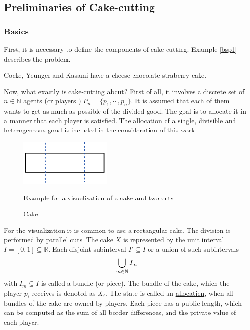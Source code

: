 \subsection{Preliminaries of Cake-cutting}
\subsubsection{Basics}
First, it is necessary to define the components of cake-cutting. Example \ref{bsp1} describes the problem.
%
\begin{bsp}
\label{bsp1}
Cocke, Younger and Kasami have a cheese-chocolate-straberry-cake. 
\end{bsp}
Now, what exactly is cake-cutting about? First of all, it involves a discrete set of $n \in \mathbb{N}$ agents (or players ) $P_n=\{p_1,\cdots,p_n\}$. It is assumed that each of them wants to get as much as possible of the divided good. The goal is to allocate it in a manner that each player is satisfied. The allocation of a single, divisible and heterogeneous good is included in the consideration of this work.\\ 
	\begin{figure}[h]
		\centering
 		 \includegraphics[width=130pt]{kek.pdf}
   \caption{Cake}Example for a visualisation of a cake and two cuts
  	 \end{figure}
For the visualization it is common to use a rectangular cake. The division is performed by parallel cuts. The cake $X$ is represented by the unit interval $I=[0,1] \subseteq \mathbb{R}$. Each disjoint subinterval $I'\subseteq I$ or a union of such subintervals $$\sideset{}{ }\bigcup\limits_{m\in\mathbb{N}}I_m$$
with $I_m\subseteq I$ is called a bundle (or piece). The bundle of the cake, which the player $p_i$ receives is denoted as $X_i$. The state is called an \underline{allocation}, when all bundles of the cake are owned by players. Each piece has a public length, which can be computed as the sum of all border differences, and the private value of each player.\\

